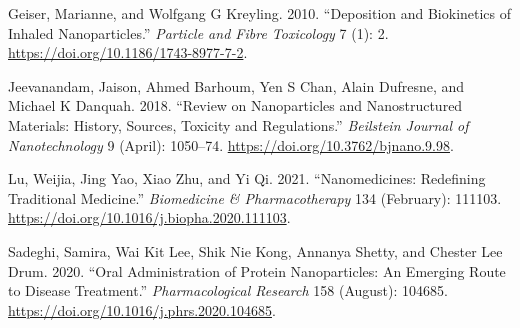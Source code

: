 \documentclass[
  letterpaper,
  DIV=11,
  numbers=noendperiod,
  oneside]{scrartcl}
\newlength{\cslhangindent}
\newlength{\cslentryspacingunit} %
\newenvironment{CSLReferences}[2] %
 {%
  \setlength{\parindent}{0pt}
  \ifodd #1
  \let\oldpar\par
  \def\par{\hangindent=\cslhangindent\oldpar}
  \fi
  \setlength{\parskip}{#2\cslentryspacingunit}
 }%
 {}
\begin{document}
\hypertarget{refs}{}
\begin{CSLReferences}{1}{0}
\leavevmode{}%
Geiser, Marianne, and Wolfgang G Kreyling. 2010. {``Deposition and
Biokinetics of Inhaled Nanoparticles.''} \emph{Particle and Fibre
Toxicology} 7 (1): 2. \url{https://doi.org/10.1186/1743-8977-7-2}.

\leavevmode{}%
Jeevanandam, Jaison, Ahmed Barhoum, Yen S Chan, Alain Dufresne, and
Michael K Danquah. 2018. {``Review on Nanoparticles and Nanostructured
Materials: History, Sources, Toxicity and Regulations.''}
\emph{Beilstein Journal of Nanotechnology} 9 (April): 1050--74.
\url{https://doi.org/10.3762/bjnano.9.98}.

\leavevmode{}%
Lu, Weijia, Jing Yao, Xiao Zhu, and Yi Qi. 2021. {``Nanomedicines:
Redefining Traditional Medicine.''} \emph{Biomedicine \&
Pharmacotherapy} 134 (February): 111103.
\url{https://doi.org/10.1016/j.biopha.2020.111103}.

\leavevmode{}%
Sadeghi, Samira, Wai Kit Lee, Shik Nie Kong, Annanya Shetty, and Chester
Lee Drum. 2020. {``Oral Administration of Protein Nanoparticles: An
Emerging Route to Disease Treatment.''} \emph{Pharmacological Research}
158 (August): 104685. \url{https://doi.org/10.1016/j.phrs.2020.104685}.

\end{CSLReferences}
\end{document}
